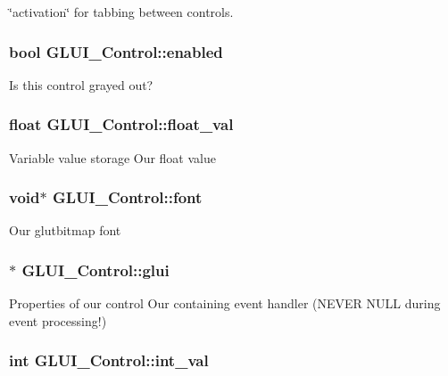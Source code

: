 \char`\"{}activation\char`\"{} for tabbing between controls. \hypertarget{class_g_l_u_i___control_a834202682d00a31a2141eae6709d37e1}{
\subsubsection[{enabled}]{\setlength{\rightskip}{0pt plus 5cm}bool G\+L\+U\+I\+\_\+\+Control\+::enabled}}\label{class_g_l_u_i___control_a834202682d00a31a2141eae6709d37e1}
Is this control grayed out? \hypertarget{class_g_l_u_i___control_ac69b8e62a6f4f16c83b70a64f73d7a1c}{
\subsubsection[{float\+\_\+val}]{\setlength{\rightskip}{0pt plus 5cm}float G\+L\+U\+I\+\_\+\+Control\+::float\+\_\+val}}\label{class_g_l_u_i___control_ac69b8e62a6f4f16c83b70a64f73d7a1c}
Variable value storage Our float value \hypertarget{class_g_l_u_i___control_a132273406b5ea6d95cd26501fc2f2027}{
\subsubsection[{font}]{\setlength{\rightskip}{0pt plus 5cm}void$\ast$ G\+L\+U\+I\+\_\+\+Control\+::font}}\label{class_g_l_u_i___control_a132273406b5ea6d95cd26501fc2f2027}
Our glutbitmap font \hypertarget{class_g_l_u_i___control_ac731aebe26d7eb0b916a9692229f0eb6}{
\subsubsection[{glui}]{$\ast$ G\+L\+U\+I\+\_\+\+Control\+::glui}}\label{class_g_l_u_i___control_ac731aebe26d7eb0b916a9692229f0eb6}
Properties of our control Our containing event handler (N\+E\+V\+E\+R N\+U\+L\+L during event processing!) \hypertarget{class_g_l_u_i___control_a4a890b5b5a854b34200b5e63f1069b4e}{
\subsubsection[{int\+\_\+val}]{\setlength{\rightskip}{0pt plus 5cm}int G\+L\+U\+I\+\_\+\+Control\+::int\+\_\+val}}\label{class_g_l_u_i___control_a4a890b5b5a854b34200b5e63f1069b4e}
